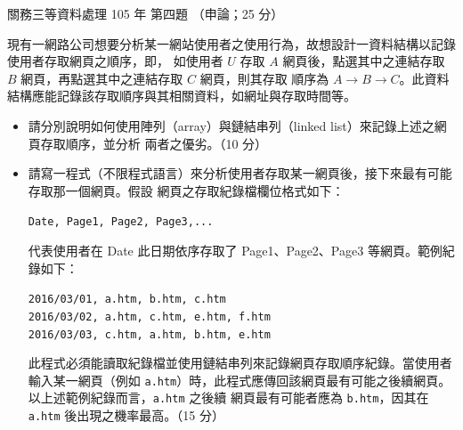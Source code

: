 \begin{pastexam}[label={px:gw3-105-ds-04}]{關務三等資料處理 105 年 第四題}
（申論；25 分）

現有一網路公司想要分析某一網站使用者之使用行為，故想設計一資料結構以記錄使用者存取網頁之順序，即，
如使用者 $U$ 存取 $A$ 網頁後，點選其中之連結存取 $B$ 網頁，再點選其中之連結存取 $C$ 網頁，則其存取
順序為 $A \to B \to C$。此資料結構應能記錄該存取順序與其相關資料，如網址與存取時間等。
\begin{itemize}[leftmargin=2em, labelsep=0.3em, itemsep=2pt]
\item[㈠] 請分別說明如何使用陣列（array）與鏈結串列（linked list）來記錄上述之網頁存取順序，並分析
兩者之優劣。（10 分）
\item[㈡] 請寫一程式（不限程式語言）來分析使用者存取某一網頁後，接下來最有可能存取那一個網頁。假設
網頁之存取紀錄檔欄位格式如下：

\texttt{Date, Page1, Page2, Page3,...}

代表使用者在 Date 此日期依序存取了 Page1、Page2、Page3 等網頁。範例紀錄如下：

\texttt{2016/03/01, a.htm, b.htm, c.htm}\\
\texttt{2016/03/02, a.htm, c.htm, e.htm, f.htm}\\
\texttt{2016/03/03, c.htm, a.htm, b.htm, e.htm}

此程式必須能讀取紀錄檔並使用鏈結串列來記錄網頁存取順序紀錄。當使用者輸入某一網頁（例如
\texttt{a.htm}）時，此程式應傳回該網頁最有可能之後續網頁。以上述範例紀錄而言，\texttt{a.htm} 之後續
網頁最有可能者應為 \texttt{b.htm}，因其在 \texttt{a.htm} 後出現之機率最高。（15 分）
\end{itemize}
\end{pastexam}

